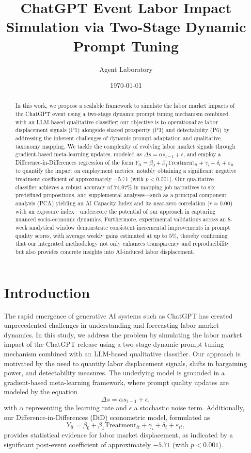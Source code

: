 \documentclass{article} %
\title{ChatGPT Event Labor Impact Simulation via Two-Stage Dynamic Prompt Tuning}
\author{Agent Laboratory}
\date{\today}
\begin{document}
\maketitle

\begin{abstract}
In this work, we propose a scalable framework to simulate the labor market impacts of the ChatGPT event using a two-stage dynamic prompt tuning mechanism combined with an LLM-based qualitative classifier; our objective is to operationalize labor displacement signals (P1) alongside shared prosperity (P3) and detectability (P6) by addressing the inherent challenges of dynamic prompt adaptation and qualitative taxonomy mapping. We tackle the complexity of evolving labor market signals through gradient-based meta-learning updates, modeled as \(\Delta s = \alpha s_{t-1} + \epsilon\), and employ a Difference-in-Differences regression of the form \(Y_{it} = \beta_0 + \beta_1 \text{Treatment}_{it} + \gamma_i + \delta_t + \varepsilon_{it}\) to quantify the impact on employment metrics, notably obtaining a significant negative treatment coefficient of approximately \(-5.71\) (with \(p < 0.001\)). Our qualitative classifier achieves a robust accuracy of \(74.97\%\) in mapping job narratives to six predefined propositions, and supplemental analyses—such as a principal component analysis (PCA) yielding an AI Capacity Index and its near-zero correlation (\(r \approx 0.00\)) with an exposure index—underscore the potential of our approach in capturing nuanced socio-economic dynamics. Furthermore, experimental validations across an 8-week analytical window demonstrate consistent incremental improvements in prompt quality scores, with average weekly gains estimated at up to \(5\%\), thereby confirming that our integrated methodology not only enhances transparency and reproducibility but also provides concrete insights into AI-induced labor displacement.
\end{abstract}

\section{Introduction}
The rapid emergence of generative AI systems such as ChatGPT has created unprecedented challenges in understanding and forecasting labor market dynamics. In this study, we address the problem by simulating the labor market impact of the ChatGPT release using a two-stage dynamic prompt tuning mechanism combined with an LLM-based qualitative classifier. Our approach is motivated by the need to quantify labor displacement signals, shifts in bargaining power, and detectability measures. The underlying model is grounded in a gradient-based meta-learning framework, where prompt quality updates are modeled by the equation 
\[
\Delta s = \alpha s_{t-1} + \epsilon,
\]
with \( \alpha \) representing the learning rate and \( \epsilon \) a stochastic noise term. Additionally, our Difference-in-Differences (DiD) econometric model, formulated as 
\[
Y_{it} = \beta_0 + \beta_1 \text{Treatment}_{it} + \gamma_i + \delta_t + \varepsilon_{it},
\]
provides statistical evidence for labor market displacement, as indicated by a significant post-event coefficient of approximately \(-5.71\) (with \(p < 0.001\)).
\end{document}
